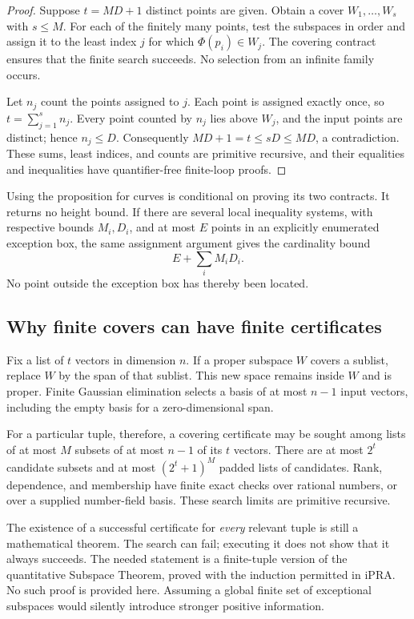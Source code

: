 \begin{proof}
Suppose $t=MD+1$ distinct points are given. Obtain a cover
$W_1,\ldots,W_s$ with $s\le M$. For each of the finitely many points,
test the subspaces in order and assign it to the least index $j$ for
which $\Phi(p_i)\in W_j$. The covering contract ensures that the finite
search succeeds. No selection from an infinite family occurs.

Let $n_j$ count the points assigned to $j$. Each point is assigned
exactly once, so $t=\sum_{j=1}^s n_j$. Every point counted by $n_j$
lies above $W_j$, and the input points are distinct; hence $n_j\le D$.
Consequently $MD+1=t\le sD\le MD$, a contradiction. These sums,
least indices, and counts are primitive recursive, and their
equalities and inequalities have quantifier-free finite-loop proofs.
\end{proof}

Using the proposition for curves is conditional on proving its two
contracts. It returns no height bound. If there are several local
inequality systems, with respective bounds $M_i,D_i$, and at most $E$
points in an explicitly enumerated exception box, the same assignment
argument gives the cardinality bound
\[
                         E+\sum_i M_iD_i.
\]
No point outside the exception box has thereby been located.

\subsection{Why finite covers can have finite certificates}

Fix a list of $t$ vectors in dimension $n$. If a proper subspace $W$
covers a sublist, replace $W$ by the span of that sublist. This new
space remains inside $W$ and is proper. Finite Gaussian elimination
selects a basis of at most $n-1$ input vectors, including the empty
basis for a zero-dimensional span.

For a particular tuple, therefore, a covering certificate may be sought
among lists of at most $M$ subsets of at most $n-1$ of its $t$ vectors.
There are at most $2^t$ candidate subsets and at most $(2^t+1)^M$
padded lists of candidates. Rank, dependence, and membership have
finite exact checks over rational numbers, or over a supplied
number-field basis. These search limits are primitive recursive.

The existence of a successful certificate for \emph{every} relevant tuple
is still a mathematical theorem. The search can fail; executing it does
not show that it always succeeds. The needed statement is a finite-tuple
version of the quantitative Subspace Theorem, proved with the induction
permitted in iPRA. No such proof is provided here. Assuming a global
finite set of exceptional subspaces would silently introduce stronger
positive information.

